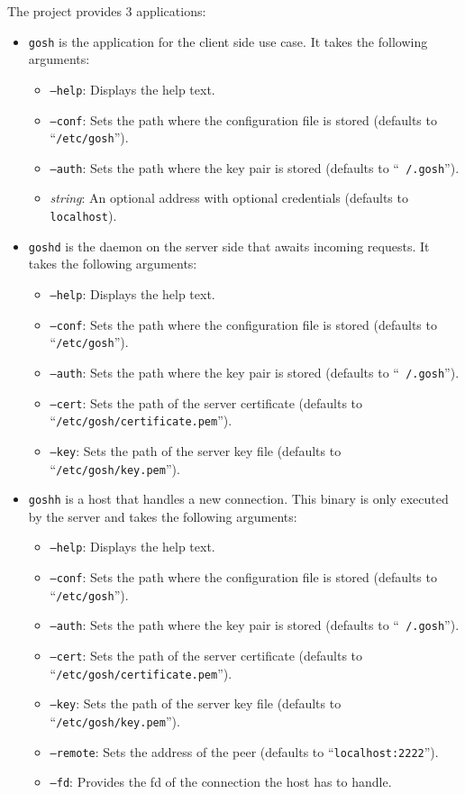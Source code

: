 \documentclass[10pt,a4paper,titlepage,twoside,english,final]{zhawreprt}
\begin{document}
The project provides 3 applications:
\begin{itemize}
\item \texttt{gosh} is the application for the client side use case.
It takes the following arguments:
\begin{itemize}
\item \texttt{--help}: Displays the help text.
\item \texttt{--conf}: Sets the path where the configuration file is stored (defaults to ``\texttt{/etc/gosh}'').
\item \texttt{--auth}: Sets the path where the key pair is stored (defaults to ``\texttt{~/.gosh}'').
\item \textit{string}: An optional address with optional credentials (defaults to \texttt{localhost}).
\end{itemize}
\item \texttt{goshd} is the \gls{daemon} on the server side that awaits incoming requests.
It takes the following arguments:
\begin{itemize}
\item \texttt{--help}: Displays the help text.
\item \texttt{--conf}: Sets the path where the configuration file is stored (defaults to ``\texttt{/etc/gosh}'').
\item \texttt{--auth}: Sets the path where the key pair is stored (defaults to ``\texttt{~/.gosh}'').
\item \texttt{--cert}: Sets the path of the server certificate (defaults to ``\texttt{/etc/gosh/certifi\linebreak{}cate.pem}'').
\item \texttt{--key}: Sets the path of the server key file (defaults to ``\texttt{/etc/gosh/key.pem}'').
\end{itemize}
\item \texttt{goshh} is a host that handles a new connection.
This binary is only executed by the server and takes the following arguments:
\begin{itemize}
\item \texttt{--help}: Displays the help text.
\item \texttt{--conf}: Sets the path where the configuration file is stored (defaults to ``\texttt{/etc/gosh}'').
\item \texttt{--auth}: Sets the path where the key pair is stored (defaults to ``\texttt{~/.gosh}'').
\item \texttt{--cert}: Sets the path of the server certificate (defaults to ``\texttt{/etc/gosh/certifi\linebreak{}cate.pem}'').
\item \texttt{--key}: Sets the path of the server key file (defaults to ``\texttt{/etc/gosh/key.pem}'').
\item \texttt{--remote}: Sets the address of the peer (defaults to ``\texttt{localhost:2222}'').
\item \texttt{--fd}: Provides the \gls{fd} of the connection the host has to handle.
\end{itemize}
\end{itemize}
\end{document}
